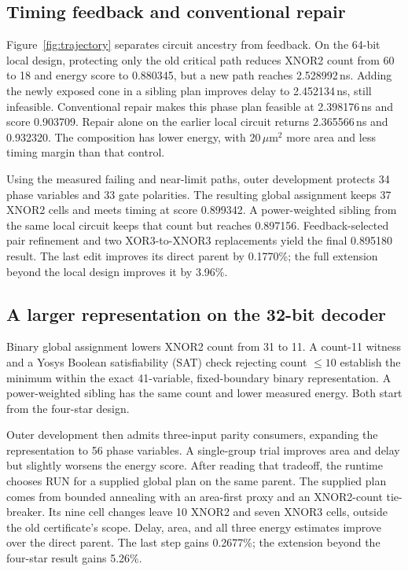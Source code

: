\documentclass[conference,10pt]{IEEEtran}
\begin{document}
\subsection{Timing feedback and conventional repair}

Figure~\ref{fig:trajectory} separates circuit ancestry from feedback. On the 64-bit local design, protecting only the old critical path reduces XNOR2 count from 60 to 18 and energy score to 0.880345, but a new path reaches 2.528992\,ns. Adding the newly exposed cone in a sibling plan improves delay to 2.452134\,ns, still infeasible. Conventional repair makes this phase plan feasible at 2.398176\,ns and score 0.903709. Repair alone on the earlier local circuit returns 2.365566\,ns and 0.932320. The composition has lower energy, with 20\,$\mu$m$^2$ more area and less timing margin than that control.

Using the measured failing and near-limit paths, outer development protects 34 phase variables and 33 gate polarities. The resulting global assignment keeps 37 XNOR2 cells and meets timing at score 0.899342. A power-weighted sibling from the same local circuit keeps that count but reaches 0.897156. Feedback-selected pair refinement and two XOR3-to-XNOR3 replacements yield the final 0.895180 result. The last edit improves its direct parent by 0.1770\%; the full extension beyond the local design improves it by 3.96\%.
\subsection{A larger representation on the 32-bit decoder}

Binary global assignment lowers XNOR2 count from 31 to 11. A count-11 witness and a Yosys Boolean satisfiability (SAT) check rejecting count $\leq10$ establish the minimum within the exact 41-variable, fixed-boundary binary representation. A power-weighted sibling has the same count and lower measured energy. Both start from the four-star design.

Outer development then admits three-input parity consumers, expanding the representation to 56 phase variables. A single-group trial improves area and delay but slightly worsens the energy score. After reading that tradeoff, the runtime chooses RUN for a supplied global plan on the same parent. The supplied plan comes from bounded annealing with an area-first proxy and an XNOR2-count tie-breaker. Its nine cell changes leave 10 XNOR2 and seven XNOR3 cells, outside the old certificate's scope. Delay, area, and all three energy estimates improve over the direct parent. The last step gains 0.2677\%; the extension beyond the four-star result gains 5.26\%.
\end{document}
